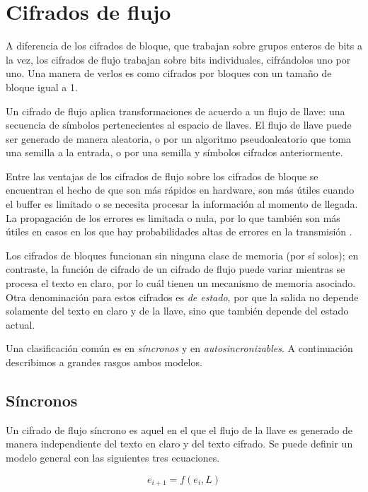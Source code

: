 %
%

\newpage
\section{Cifrados de flujo}

A diferencia de los cifrados de bloque, que trabajan sobre grupos enteros de
bits a la vez, los cifrados de flujo trabajan sobre bits individuales,
cifrándolos uno por uno. Una manera de verlos es como cifrados por bloques con
un tamaño de bloque igual a 1.

Un cifrado de flujo aplica transformaciones de acuerdo a un flujo de llave:
una secuencia de símbolos pertenecientes al espacio de llaves. El flujo de
llave puede ser generado de manera aleatoria, o por un algoritmo
pseudoaleatorio que toma una semilla a la entrada, o por una semilla y
símbolos cifrados anteriormente.

Entre las ventajas de los cifrados de flujo sobre los cifrados de bloque se
encuentran el hecho de que son más rápidos en hardware, son más útiles cuando
el buffer es limitado o se necesita procesar la información al momento de
llegada. La propagación de los errores es limitada o nula, por lo que también
son más útiles en casos en los que hay probabilidades altas de errores en la
transmisión \cite{menezes}.

Los cifrados de bloques funcionan sin ninguna clase de memoria (por sí solos);
en contraste, la función de cifrado de un cifrado de flujo puede variar
mientras se procesa el texto en claro, por lo cuál tienen un mecanismo de
memoria asociado. Otra denominación para estos cifrados es \textit{de estado},
por que la salida no depende solamente del texto en claro y de la llave, sino
que también depende del estado actual.

Una clasificación común es en \textit{síncronos} y
en \textit{autosincronizables}. A continuación describimos a grandes rasgos
ambos modelos.

\subsection{Síncronos}

Un cifrado de flujo síncrono es aquel en el que el flujo de la llave es
generado de manera independiente del texto en claro y del texto cifrado. Se
puede definir un modelo general con las siguientes tres ecuaciones.

\begin{equation}
  \label{sinc:cambio_de_estado}
  e_{i+1} = f(e_i, L)
\end{equation}

